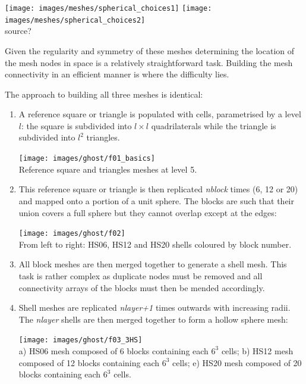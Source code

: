 \begin{center}
\texttt{[image: images/meshes/spherical\_choices1]}
\texttt{[image: images/meshes/spherical\_choices2]}\\
{\captionfont source?}
\end{center}



Given the regularity and symmetry of these meshes determining the location of the 
mesh nodes in space is a relatively straightforward task. Building the mesh connectivity in an 
efficient manner is where the difficulty lies.

The approach to building all three meshes is identical:
\begin{enumerate}
\item A reference square or triangle is populated with cells,
parametrised by a level $l$: the square is subdivided into $l\times l$ quadrilaterals while 
the triangle is subdivided into $l^2$ triangles.
\begin{center}
\texttt{[image: images/ghost/f01\_basics]}\\
{\captionfont Reference square and triangles meshes at level 5.}
\end{center}

\item This reference square or triangle is then replicated {\sl nblock} times (6, 12 or 20) and mapped
onto a portion of a unit sphere. The blocks are such that their union covers a full sphere
but they cannot overlap except at the edges:
\begin{center}
\texttt{[image: images/ghost/f02]}\\
{\captionfont From left to right: HS06, HS12 and HS20 shells coloured by block number.}
\end{center}

\item All block meshes are then merged together to generate a shell mesh. This task is rather 
complex as duplicate nodes must be removed and all connectivity arrays of the blocks must then 
be mended accordingly. 

\item Shell meshes are replicated {\sl nlayer+1} times outwards with increasing radii. 
The {\sl nlayer} shells are then merged together to form a hollow sphere mesh:
\begin{center}
\texttt{[image: images/ghost/f03\_3HS]}\\
{\captionfont a) HS06 mesh composed of 6 blocks containing each $6^3$ cells; 
b) HS12 mesh composed of 12 blocks containing each 
$6^3$ cells; e) HS20 mesh composed of 20 blocks containing each $6^3$ cells.}
\end{center}

\end{enumerate}



